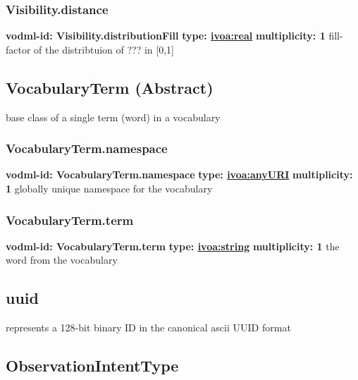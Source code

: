     \subsubsection{Visibility.distance}
      \textbf{vodml-id: Visibility.distributionFill} \newline
      \textbf{type: \hyperref[sect:ivoa]{ivoa:real}} \newline
      \textbf{multiplicity: 1} \newline
      fill-factor of the distribtuion of ??? in [0,1]

  \subsection{VocabularyTerm (Abstract)}
  \label{sect:VocabularyTerm}
    base class of a single term (word) in a vocabulary

    \subsubsection{VocabularyTerm.namespace}
      \textbf{vodml-id: VocabularyTerm.namespace} \newline
      \textbf{type: \hyperref[sect:ivoa]{ivoa:anyURI}} \newline
      \textbf{multiplicity: 1} \newline
      globally unique namespace for the vocabulary

    \subsubsection{VocabularyTerm.term}
      \textbf{vodml-id: VocabularyTerm.term} \newline
      \textbf{type: \hyperref[sect:ivoa]{ivoa:string}} \newline
      \textbf{multiplicity: 1} \newline
      the word from the vocabulary

  \subsection{uuid}
  \label{sect:uuid}
  represents a 128-bit binary ID in the canonical ascii UUID format

  \subsection{ObservationIntentType}
  \label{sect:ObservationIntentType}

